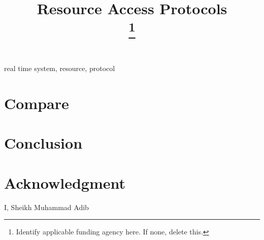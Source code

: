 \documentclass[conference]{IEEEtran}
\begin{document}
\title{Resource Access Protocols\\
{\footnotesize }
\thanks{Identify applicable funding agency here. If none, delete this.}
}

\author{

}

\maketitle


\begin{IEEEkeywords}
real time system, resource, protocol 
\end{IEEEkeywords}










\section{Compare}

\section{Conclusion}

\section*{Acknowledgment}

I, Sheikh Muhammad Adib 
\end{document}
